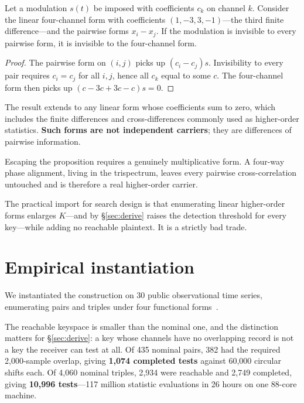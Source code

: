 \begin{proposition}
Let a modulation $s(t)$ be imposed with coefficients $c_k$ on channel $k$.
Consider the linear four-channel form with coefficients $(1,-3,3,-1)$---the third
finite difference---and the pairwise forms $x_i-x_j$. If the modulation is
invisible to every pairwise form, it is invisible to the four-channel form.
\end{proposition}

\begin{proof}
The pairwise form on $(i,j)$ picks up $(c_i-c_j)s$. Invisibility to every pair
requires $c_i=c_j$ for all $i,j$, hence all $c_k$ equal to some $c$. The
four-channel form then picks up $(c-3c+3c-c)s=0$.
\end{proof}

The result extends to any linear form whose coefficients sum to zero, which
includes the finite differences and cross-differences commonly used as
higher-order statistics. \textbf{Such forms are not independent carriers}; they
are differences of pairwise information.

Escaping the proposition requires a genuinely multiplicative form. A four-way
phase alignment, living in the trispectrum, leaves every pairwise
cross-correlation untouched and is therefore a real higher-order carrier.

The practical import for search design is that enumerating linear higher-order
forms enlarges $K$---and by \S\ref{sec:derive} raises the detection threshold for
every key---while adding no reachable plaintext. It is a strictly bad trade.

\section{Empirical instantiation}\label{sec:empirical}

We instantiated the construction on 30 public observational time series,
enumerating pairs and triples under four functional forms~\cite{griffin}.

The reachable keyspace is smaller than the nominal one, and the distinction
matters for \S\ref{sec:derive}: a key whose channels have no overlapping record
is not a key the receiver can test at all. Of 435 nominal pairs, 382 had the
required 2{,}000-sample overlap, giving \textbf{1{,}074 completed tests} against
60{,}000 circular shifts each. Of 4{,}060 nominal triples, 2{,}934 were reachable
and 2{,}749 completed, giving \textbf{10{,}996 tests}---117 million statistic
evaluations in 26 hours on one 88-core machine.

